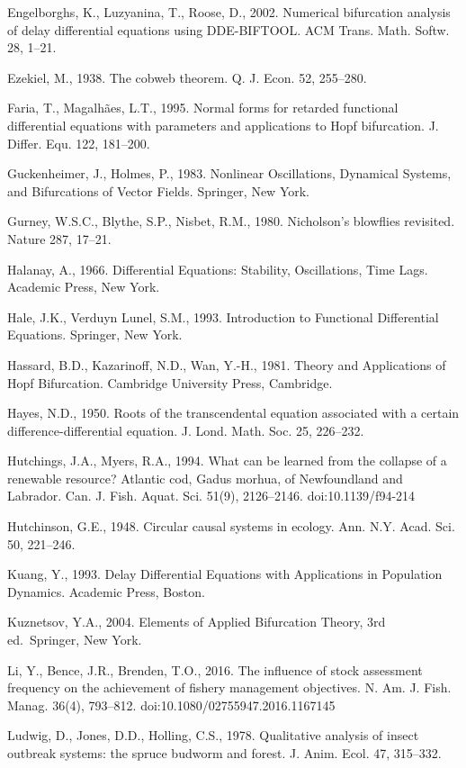 \documentclass[11pt]{article}
\begin{document}
Engelborghs, K., Luzyanina, T., Roose, D., 2002. Numerical bifurcation
analysis of delay differential equations using DDE-BIFTOOL. ACM Trans.
Math. Softw. 28, 1--21.

Ezekiel, M., 1938. The cobweb theorem. Q. J. Econ. 52, 255--280.

Faria, T., Magalh\~aes, L.T., 1995. Normal forms for retarded functional
differential equations with parameters and applications to Hopf
bifurcation. J. Differ. Equ. 122, 181--200.

Guckenheimer, J., Holmes, P., 1983. Nonlinear Oscillations, Dynamical
Systems, and Bifurcations of Vector Fields. Springer, New York.

Gurney, W.S.C., Blythe, S.P., Nisbet, R.M., 1980. Nicholson's blowflies
revisited. Nature 287, 17--21.

Halanay, A., 1966. Differential Equations: Stability, Oscillations, Time
Lags. Academic Press, New York.

Hale, J.K., Verduyn Lunel, S.M., 1993. Introduction to Functional
Differential Equations. Springer, New York.

Hassard, B.D., Kazarinoff, N.D., Wan, Y.-H., 1981. Theory and
Applications of Hopf Bifurcation. Cambridge University Press, Cambridge.

Hayes, N.D., 1950. Roots of the transcendental equation associated with
a certain difference-differential equation. J. Lond. Math. Soc. 25,
226--232.

Hutchings, J.A., Myers, R.A., 1994. What can be learned from the
collapse of a renewable resource? Atlantic cod, Gadus morhua, of
Newfoundland and Labrador. Can. J. Fish. Aquat. Sci. 51(9), 2126--2146.
doi:10.1139/f94-214

Hutchinson, G.E., 1948. Circular causal systems in ecology. Ann. N.Y.
Acad. Sci. 50, 221--246.

Kuang, Y., 1993. Delay Differential Equations with Applications in
Population Dynamics. Academic Press, Boston.

Kuznetsov, Y.A., 2004. Elements of Applied Bifurcation Theory, 3rd
ed.~Springer, New York.

Li, Y., Bence, J.R., Brenden, T.O., 2016. The influence of stock
assessment frequency on the achievement of fishery management
objectives. N. Am. J. Fish. Manag. 36(4), 793--812.
doi:10.1080/02755947.2016.1167145

Ludwig, D., Jones, D.D., Holling, C.S., 1978. Qualitative analysis of
insect outbreak systems: the spruce budworm and forest. J. Anim. Ecol.
47, 315--332.
\end{document}
